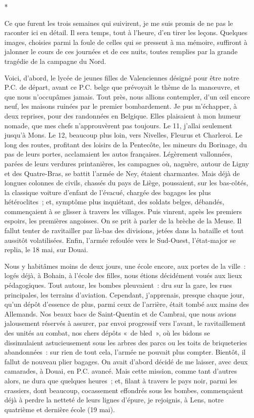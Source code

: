 \documentclass[french,twoside]{book} %
\begin{document}
\begin{center}
*\end{center}
\noindent Ce que furent les trois semaines qui suivirent, je me suis promis de ne pas le raconter ici en détail. Il sera temps, tout à l’heure, d’en tirer les leçons. Quelques images, choisies parmi la foule de celles qui se pressent à ma mémoire, suffiront à jalonner   le cours de ces journées et de ces nuits, toutes remplies par la grande tragédie de la campagne du Nord.\par
Voici, d’abord, le lycée de jeunes filles de Valenciennes désigné pour être notre P.C. de départ, avant ce P.C. belge que prévoyait le thème de la manœuvre, et que nous n’occupâmes jamais. Tout près, nous allions contempler, d’un œil encore neuf, les maisons ruinées par le premier bombardement. Je pus m’échapper, à deux reprises, pour des randonnées en Belgique. Elles plaisaient à mon humeur nomade, que mes chefs n’approuvèrent pas toujours. Le 11, j’allai seulement jusqu’à Mons. Le 12, beaucoup plus loin, vers Nivelles, Fleurus et Charleroi. Le long des routes, profitant des loisirs de la Pentecôte, les mineurs du Borinage, du pas de leurs portes, acclamaient les autos françaises. Légèrement vallonnées, parées de leurs verdures printanières, les campagnes où, naguère, autour de Ligny et des Quatre-Bras, se battit l’armée de Ney, étaient charmantes. Mais déjà de longues colonnes de civils, chassés du pays de Liège, poussaient, sur les bas-côtés, la classique voiture d’enfant de l’évacué, chargée des bagages les plus hétéroclites ; et, symptôme plus inquiétant, des soldats belges, débandés, commençaient à se glisser à travers les villages. Puis vinrent, après les premiers espoirs, les premières angoisses. On se prit à parler de la brèche de la Meuse. Il fallut tenter de ravitailler par là-bas des divisions, jetées dans la bataille et tout aussitôt volatilisées. Enfin, l’armée refoulée vers le Sud-Ouest, l’état-major se replia, le 18 mai, sur Douai.\par
Nous y habitâmes moins de deux jours, une école encore, aux portes de la ville : logés déjà, à Bohain, à l’école des filles, nous étions décidément voués aux lieux pédagogiques. Tout autour, les bombes pleuvaient : dru sur la gare, les rues principales, les terrains d’aviation. Cependant, j’apprenais, presque chaque jour, qu’un dépôt d’essence de plus, parmi   ceux de l’arrière, était tombé aux mains des Allemands. Nos beaux bacs de Saint-Quentin et de Cambrai, que nous avions jalousement réservés à assurer, par envoi progressif vers l’avant, le ravitaillement des unités au combat, nos chers dépôts « de bled », où les bidons se dissimulaient astucieusement sous les arbres des parcs ou les toits de briqueteries abandonnées : sur rien de tout cela, l’armée ne pouvait plus compter. Bientôt, il fallut de nouveau plier bagages. On avait d’abord décidé de me laisser, avec deux camarades, à Douai, en P.C. avancé. Mais cette mission, comme tant d’autres alors, ne dura que quelques heures ; et, filant à travers le pays noir, parmi les crassiers, dont beaucoup, cocassement effondrés sous les bombes, commençaient déjà à perdre la netteté de leurs lignes d’épure, je rejoignis, à Lens, notre quatrième et dernière école (19 mai).\par
\end{document}
